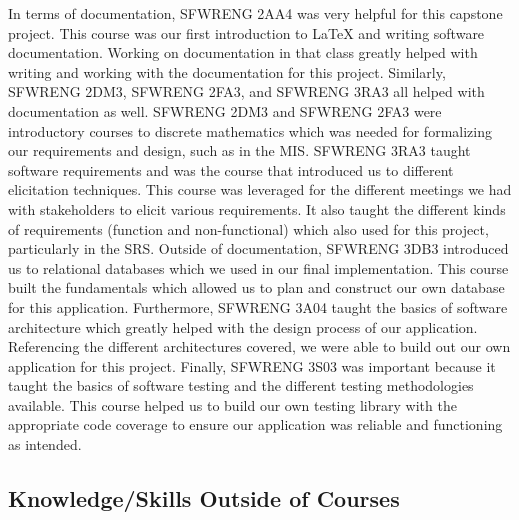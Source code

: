 \documentclass{article}
\begin{document}
In terms of documentation, SFWRENG 2AA4 was very helpful for this capstone project. This course was our first
introduction to \LaTeX{} and writing software documentation. Working on documentation in that class greatly helped
with writing and working with the documentation for this project. Similarly, SFWRENG 2DM3, SFWRENG 2FA3, and SFWRENG 3RA3
all helped with documentation as well. SFWRENG 2DM3 and SFWRENG 2FA3 were introductory courses to discrete mathematics
which was needed for formalizing our requirements and design, such as in the MIS. SFWRENG 3RA3 taught software requirements and was the course
that introduced us to different elicitation techniques. This course was leveraged for the different meetings we had with stakeholders to elicit
various requirements. It also taught the different kinds of requirements (function and non-functional) which also used for this project, particularly
in the SRS. Outside of documentation, SFWRENG 3DB3 introduced us to relational databases which we used in our final
implementation. This course built the fundamentals which allowed us to plan and construct our own database for this application.
Furthermore, SFWRENG 3A04 taught the basics of software architecture which greatly helped with the design process of our
application. Referencing the different architectures covered, we were able to build out our own application for this project. Finally,
SFWRENG 3S03 was important because it taught the basics of software testing and the different testing methodologies available. This
course helped us to build our own testing library with the appropriate code coverage to ensure our application was reliable
and functioning as intended.

\subsection{Knowledge/Skills Outside of Courses}

\end{document}
